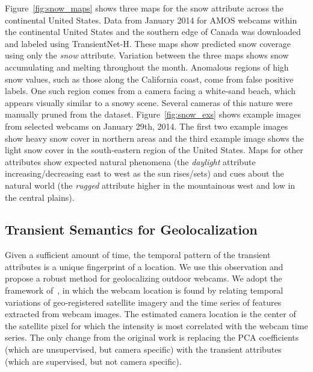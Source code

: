 \documentclass[10pt,twocolumn,letterpaper]{article}
\newcommand{\figref}[1]{Figure~\ref{fig:#1}}
\begin{document}
\figref{snow_maps} shows
three maps for the snow attribute across the continental United States.  Data
from January 2014 for AMOS webcams within the continental United States and the
southern edge of Canada was downloaded and labeled using TransientNet-H. These
maps show predicted snow coverage using only the \emph{snow} attribute.
Variation between the three maps shows snow accumulating and melting throughout
the month.  Anomalous regions of high snow values, such as those along the
California coast, come from false positive labels.  One such region comes from
a camera facing a white-sand beach, which appears visually similar to a snowy
scene.  Several cameras of this nature were manually pruned from the dataset.
\figref{snow_exs} shows example images from selected webcams on January 29th,
2014. The first two example images show heavy snow cover in northern areas and
the third example image shows the light snow cover in the south-eastern region
of the United States.  Maps for other attributes show expected natural
phenomena (the \textit{daylight} attribute increasing/decreasing east to west
as the sun rises/sets) and cues about the natural world (the \textit{rugged}
attribute higher in the mountainous west and low in the central plains).  

\subsection{Transient Semantics for Geolocalization}

Given a sufficient amount of time, the temporal pattern of the
transient attributes is a unique fingerprint of a location. We use
this observation and propose a robust method for geolocalizing outdoor
webcams. We adopt the framework of~\cite{jacobs07geolocate}, in which
the webcam location is found by relating temporal variations of
geo-registered satellite imagery and the time series of features
extracted from webcam images. The estimated camera location is the
center of the satellite pixel for which the intensity is most
correlated with the webcam time series. The only change from the
original work is replacing the PCA coefficients (which are
unsupervised, but camera specific) with the transient attributes
(which are supervised, but not camera specific).
\end{document}
